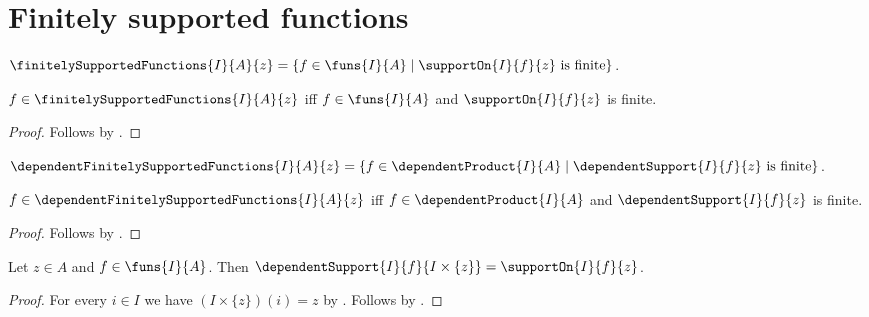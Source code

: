 






\section{Finitely supported functions}

\begin{definition}\label{finitely_supported_functions}
    $\finitelySupportedFunctions{I}{A}{z}
        =\{f\in\funs{I}{A}\mid
            \text{$\supportOn{I}{f}{z}$ is finite}\}$.
\end{definition}

\begin{proposition}\label{finitely_supported_functions_iff}
    $f\in\finitelySupportedFunctions{I}{A}{z}$ iff
        $f\in\funs{I}{A}$ and $\supportOn{I}{f}{z}$ is finite.
\end{proposition}
\begin{proof}
    Follows by .
\end{proof}

\begin{definition}\label{dependent_finitely_supported_functions}
    $\dependentFinitelySupportedFunctions{I}{A}{z}
        =\{f\in\dependentProduct{I}{A}\mid
            \text{$\dependentSupport{I}{f}{z}$ is finite}\}$.
\end{definition}

\begin{proposition}\label{dependent_finitely_supported_functions_iff}
    $f\in\dependentFinitelySupportedFunctions{I}{A}{z}$ iff
        $f\in\dependentProduct{I}{A}$ and
        $\dependentSupport{I}{f}{z}$ is finite.
\end{proposition}
\begin{proof}
    Follows by
        .
\end{proof}


\begin{theorem}\label{constant_family_support}
    Let $z\in A$ and $f\in\funs{I}{A}$.
    Then
        $\dependentSupport{I}{f}{I\times\{z\}}
            =\supportOn{I}{f}{z}$.
\end{theorem}
\begin{proof}
    For every $i\in I$ we have $(I\times\{z\})(i)=z$ by
        .
    Follows by
        .
\end{proof}

